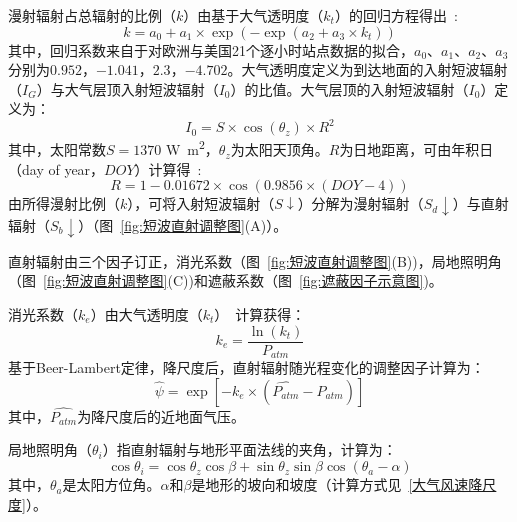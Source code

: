 漫射辐射占总辐射的比例（$k$）由基于大气透明度（$k_{t}$）的回归方程得出~\citep{ruizarias2010}:
\begin{equation}
k=a_{0}+a_{1} \times \exp \left(- \exp \left( a_{2}+a_{3} \times k_{t} \right) \right)
\end{equation}
其中，回归系数来自于对欧洲与美国21个逐小时站点数据的拟合，$a_{0}$、$a_{1}$、$a_{2}$、$a_{3}$分别为$0.952$，$-1.041$，$2.3$，$-4.702$。大气透明度定义为到达地面的入射短波辐射（$I_{G}$）与大气层顶入射短波辐射（$I_{0}$）的比值。大气层顶的入射短波辐射（$I_{0}$）定义为：
\begin{equation}
I_{0}=S \times \cos{\left(\theta_{z}\right)} \times R^{2}
\end{equation}
其中，太阳常数$S=1370$ \unit{W.m^{2}}，$\theta_{z}$为太阳天顶角。$R$为日地距离，可由年积日（day of year，$DOY$）计算得~\citep{eva1998}:
\begin{equation}
R=1-0.01672 \times \cos{\left( 0.9856 \times \left(DOY-4 \right)\right)}
\end{equation}
由所得漫射比例（$k$），可将入射短波辐射（$S\downarrow$）分解为漫射辐射（$S_{d}\downarrow$）与直射辐射（$S_{b}\downarrow$）（图~\ref{fig:短波直射调整图}(A)）。

直射辐射由三个因子订正，消光系数（图~\ref{fig:短波直射调整图}(B))，局地照明角（图~\ref{fig:短波直射调整图}(C))和遮蔽系数（图~\ref{fig:遮蔽因子示意图})。

消光系数（$k_{e}$）由大气透明度（$k_{t}$）~\citep{gupta2016}计算获得：
\begin{equation}
k_{e}=\frac{\ln{\left(k_{t}\right)}}{P_{a t m}}
\end{equation}
基于Beer-Lambert定律，降尺度后，直射辐射随光程变化的调整因子计算为：
\begin{equation}
\hat{\psi}=\exp{\left[ -k_{e} \times \left(\hat{P_{a t m}}-P_{a t m} \right) \right]} 
\end{equation}
其中，$\hat{P_{a t m}}$为降尺度后的近地面气压。

局地照明角（$\theta_{i}$）指直射辐射与地形平面法线的夹角，计算为：
\begin{equation}
\cos{\theta_{i}}=\cos{\theta_{z}}\cos{\beta}+\sin{\theta_{z}}\sin{\beta}\cos{\left(\theta_{a}-\alpha\right)}
\end{equation}
其中，$\theta_{a}$是太阳方位角。$\alpha$和$\beta$是地形的坡向和坡度（计算方式见~\ref{大气风速降尺度}）。

